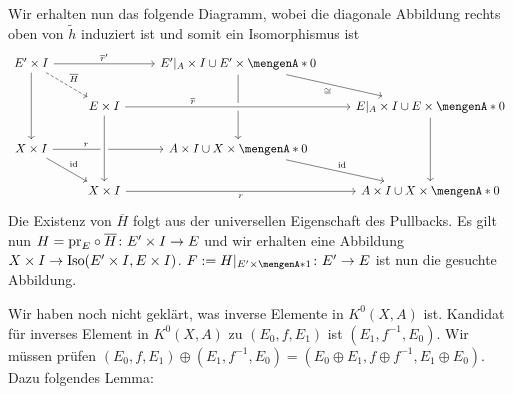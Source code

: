 Wir erhalten nun das folgende Diagramm, wobei die diagonale Abbildung rechts oben von $\tilde{h}$ induziert ist und somit ein Isomorphismus ist
\[
	\begin{tikzcd}[] %
		E' \times I \ar[dd] \ar[rr,"\overline{r}'"] \ar[dr,"\overline{H}",dashed]& & E'|_A \times I \cup E' \times \set{0} \ar[dd] \drar["\cong"'] \\
		& E \times I \ar[rr,"\overline{r}", crossing over,pos=0.3] & & E|_A \times I \cup E \times \set{0} \ar[dd] \\
		X \times I \ar[rr,"r",pos=0.3] \ar[dr,"\id"] & & A \times I \cup X \times \set{0} \ar[dr,"\id"] \\
		& X \times I \ar[from=uu,crossing over] \ar[rr,"r"']& & A \times I \cup X \times \set{0} 
	\end{tikzcd}
\]
Die Existenz von $\overline{H}$ folgt aus der universellen Eigenschaft des Pullbacks. Es gilt nun $H=\mathrm{pr}_E \circ \overline{H} \colon E' \times I \to E$ und wir erhalten
eine Abbildung $X \times I \to \operatorname{Iso}(E' \times I, E \times I)$. $F := H|_{E' \times \set{1}} \colon E' \to E$ ist nun die gesuchte Abbildung. \bewende \bigskip

Wir haben noch nicht geklärt, was inverse Elemente in $K^0(X,A)$ ist. Kandidat für inverses Element in $K^0(X,A)$ zu $(E_0,f,E_1)$ ist $(E_1, f ^{-1},E_0)$. Wir müssen
prüfen $(E_0,f,E_1) \oplus (E_1,f ^{-1}, E_0)= (E_0 \oplus E_1, f \oplus  f ^{-1},E_1 \oplus E_0)$. Dazu folgendes Lemma:

